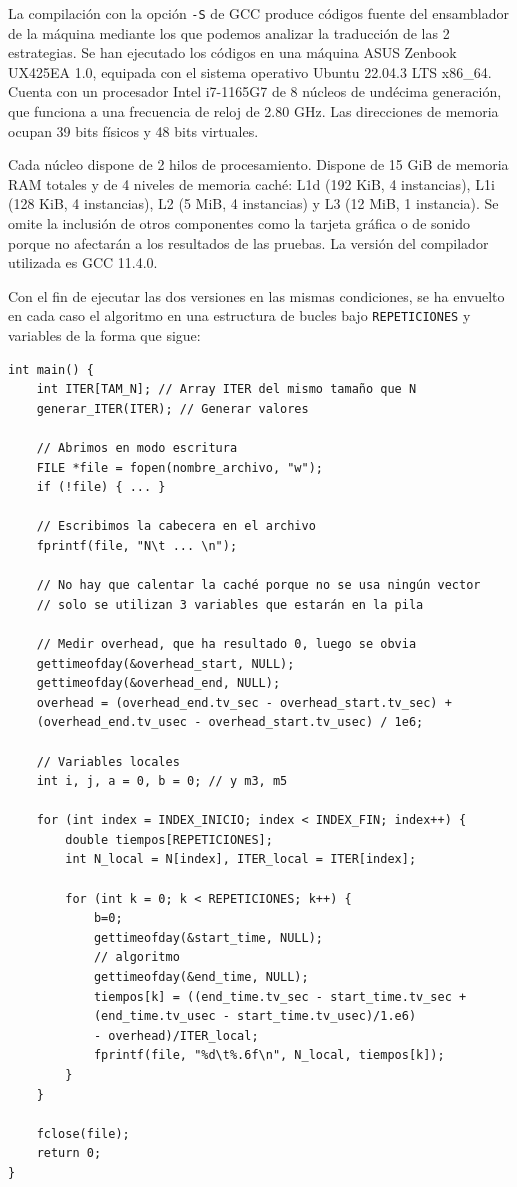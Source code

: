 \documentclass[11pt,a4paper,twoside]{article}
\theoremstyle{definition}
\begin{document}
	La compilación con la opción \texttt{-S} de GCC produce códigos fuente del ensamblador de la máquina mediante los que podemos analizar la traducción de las 2 estrategias. Se han ejecutado los códigos en una máquina ASUS Zenbook UX425EA 1.0, equipada con el sistema operativo Ubuntu 22.04.3 LTS x86\_64. Cuenta con un procesador Intel i7-1165G7 de 8 núcleos de undécima generación, que funciona a una frecuencia de reloj de 2.80 GHz. Las direcciones de memoria ocupan 39 bits físicos y 48 bits virtuales.
	
	Cada núcleo dispone de 2 hilos de procesamiento. Dispone de 15 GiB de memoria RAM totales y de 4 niveles de memoria caché: L1d (192 KiB, 4 instancias), L1i (128 KiB, 4 instancias), L2 (5 MiB, 4 instancias) y L3 (12 MiB, 1 instancia). Se omite la inclusión de otros componentes como la tarjeta gráfica o de sonido porque no afectarán a los resultados de las pruebas. La versión del compilador utilizada es GCC 11.4.0.

	Con el fin de ejecutar las dos versiones en las mismas condiciones, se ha envuelto en cada caso el algoritmo en una estructura de bucles bajo \texttt{REPETICIONES} y variables de la forma que sigue:
	
	\begin{verbatim}
int main() {
	int ITER[TAM_N]; // Array ITER del mismo tamaño que N
	generar_ITER(ITER); // Generar valores
	
	// Abrimos en modo escritura
	FILE *file = fopen(nombre_archivo, "w"); 
	if (!file) { ... }
	
	// Escribimos la cabecera en el archivo
	fprintf(file, "N\t ... \n");
	
	// No hay que calentar la caché porque no se usa ningún vector
	// solo se utilizan 3 variables que estarán en la pila
	
	// Medir overhead, que ha resultado 0, luego se obvia
	gettimeofday(&overhead_start, NULL);
	gettimeofday(&overhead_end, NULL);
	overhead = (overhead_end.tv_sec - overhead_start.tv_sec) +
	(overhead_end.tv_usec - overhead_start.tv_usec) / 1e6;
	
	// Variables locales
	int i, j, a = 0, b = 0; // y m3, m5
	
	for (int index = INDEX_INICIO; index < INDEX_FIN; index++) {
		double tiempos[REPETICIONES];
		int N_local = N[index], ITER_local = ITER[index];
		
		for (int k = 0; k < REPETICIONES; k++) {
			b=0;
			gettimeofday(&start_time, NULL);
			// algoritmo
			gettimeofday(&end_time, NULL);
			tiempos[k] = ((end_time.tv_sec - start_time.tv_sec +
			(end_time.tv_usec - start_time.tv_usec)/1.e6)
			- overhead)/ITER_local;
			fprintf(file, "%d\t%.6f\n", N_local, tiempos[k]);
		}
	}
	
	fclose(file);
	return 0;
}
	\end{verbatim}
\end{document}
